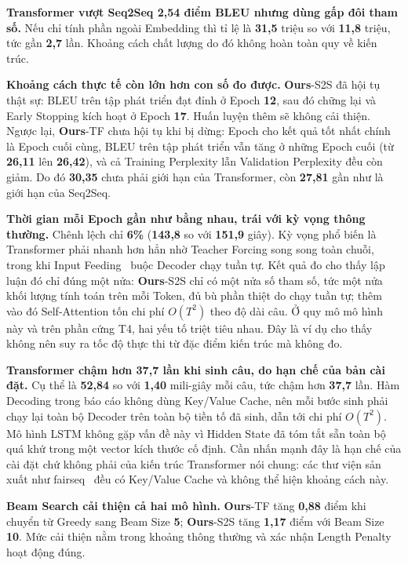 \documentclass[11pt,a4paper]{article}
\newcommand{\ours}{\textbf{Ours}}
\begin{document}
\textbf{Transformer vượt Seq2Seq 2,54 điểm BLEU nhưng dùng gấp đôi tham số.}
Nếu chỉ tính phần ngoài Embedding thì tỉ lệ là \textbf{31,5} triệu so với
\textbf{11,8} triệu, tức gần \textbf{2,7} lần. Khoảng cách chất lượng do đó
không hoàn toàn quy về kiến trúc.

\textbf{Khoảng cách thực tế còn lớn hơn con số đo được.} \ours{}-S2S đã hội tụ
thật sự: BLEU trên tập phát triển đạt đỉnh ở Epoch \textbf{12}, sau đó chững lại
và Early Stopping kích hoạt ở Epoch \textbf{17}. Huấn luyện thêm sẽ không cải
thiện. Ngược lại, \ours{}-TF chưa hội tụ khi bị dừng: Epoch cho kết quả tốt nhất
chính là Epoch cuối cùng, BLEU trên tập phát triển vẫn tăng ở những Epoch cuối
(từ \textbf{26,11} lên \textbf{26,42}), và cả Training Perplexity lẫn Validation
Perplexity đều còn giảm. Do đó \textbf{30,35} chưa phải giới hạn của Transformer,
còn \textbf{27,81} gần như là giới hạn của Seq2Seq.

\textbf{Thời gian mỗi Epoch gần như bằng nhau, trái với kỳ vọng thông thường.}
Chênh lệch chỉ \textbf{6\%} (\textbf{143,8} so với \textbf{151,9} giây). Kỳ vọng
phổ biến là Transformer phải nhanh hơn hẳn nhờ Teacher Forcing song song toàn
chuỗi, trong khi Input Feeding~\cite{luong2015emnlp} buộc Decoder chạy tuần tự.
Kết quả đo cho thấy lập luận đó chỉ đúng một nửa: \ours{}-S2S chỉ có một nửa số
tham số, tức một nửa khối lượng tính toán trên mỗi Token, đủ bù phần thiệt do
chạy tuần tự; thêm vào đó Self-Attention tốn chi phí $O(T^2)$ theo độ dài câu. Ở
quy mô mô hình này và trên phần cứng T4, hai yếu tố triệt tiêu nhau. Đây là ví
dụ cho thấy không nên suy ra tốc độ thực thi từ đặc điểm kiến trúc mà không đo.

\textbf{Transformer chậm hơn 37,7 lần khi sinh câu, do hạn chế của bản cài đặt.}
Cụ thể là \textbf{52,84} so với \textbf{1,40} mili-giây mỗi câu, tức chậm hơn
\textbf{37,7} lần. Hàm
Decoding trong báo cáo không dùng Key/Value Cache, nên mỗi bước sinh phải chạy
lại toàn bộ Decoder trên toàn bộ tiền tố đã sinh, dẫn tới chi phí $O(T^2)$. Mô
hình LSTM không gặp vấn đề này vì Hidden State đã tóm tắt sẵn toàn bộ quá khứ
trong một vector kích thước cố định. Cần nhấn mạnh đây là hạn chế của cài đặt
chứ không phải của kiến trúc Transformer nói chung: các thư viện sản xuất như
fairseq~\cite{ott2018} đều có Key/Value Cache và không thể hiện khoảng cách này.

\textbf{Beam Search cải thiện cả hai mô hình.} \ours{}-TF tăng \textbf{0,88}
điểm khi chuyển từ Greedy sang Beam Size \textbf{5}; \ours{}-S2S tăng
\textbf{1,17} điểm với Beam Size \textbf{10}. Mức cải thiện nằm trong khoảng
thông thường và xác nhận Length Penalty~\cite{wu2016} hoạt động đúng.
\end{document}
